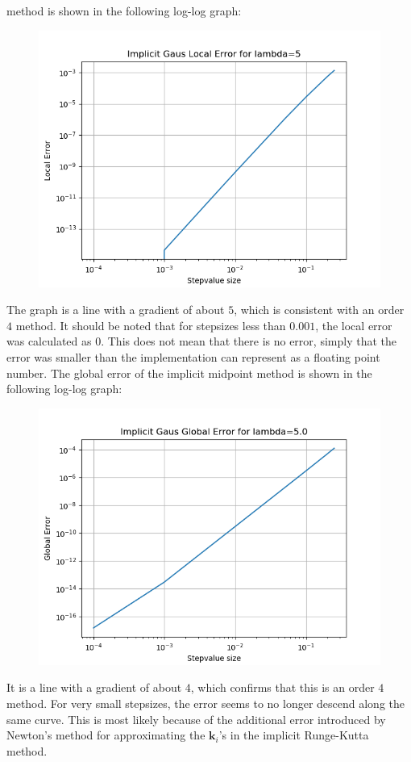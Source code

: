 \documentclass{article}
\begin{document}
\begin{itemize}
		method is shown in the following log-log graph:
		\begin{figure}[H]
			\includegraphics[scale=0.6]{implicit_gauss_local_loglog}
		\end{figure}
		The graph is a line with a gradient of about $5$, which is
		consistent with an order $4$ method.  It should be noted that
		for stepsizes less than $0.001$, the local error was calculated
		as $0$.  This does not mean that there is no error, simply that
		the error was smaller than the implementation can represent as a
		floating point number.
		The global error of the implicit midpoint
		method is shown in the following log-log graph:
		\begin{figure}[H]
			\includegraphics[scale=0.6]{implicit_gauss_global_loglog}
		\end{figure}
		It is a line with a gradient of about $4$, which confirms that
		this is an order $4$ method. For very small stepsizes, the error
		seems to no longer descend along the same curve.  This is most
		likely because of the additional error introduced by Newton's
		method for approximating the $\mathbf{k}_i$'s in the implicit Runge-Kutta
		method. 


\end{itemize}
\end{document}
